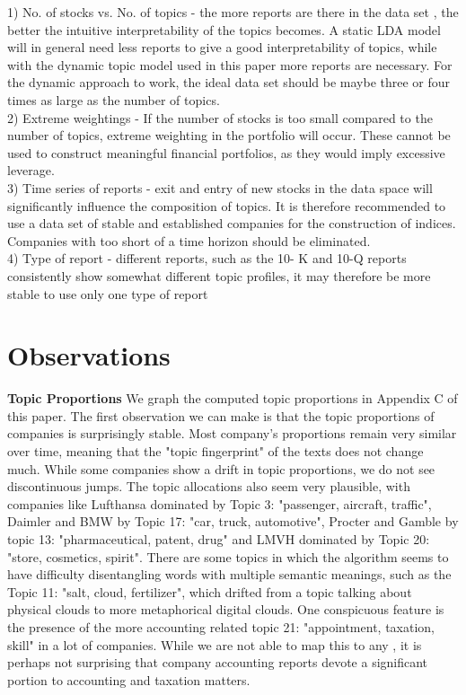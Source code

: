 \documentclass[12pt,journal,letterpaper,oneside,onecolumn]{IEEEtran}
\begin{document}
1) No. of stocks vs. No. of topics - the more reports are there in the data set , the better the intuitive interpretability of the topics becomes. A static LDA model will in general need less reports to give a good interpretability of topics, while with the dynamic topic model used in this paper more reports are necessary. For the dynamic approach to work, the ideal data set should be maybe three or four times as large as the number of topics.
\\
2) Extreme weightings - If the number of stocks is too small compared to the number of topics, extreme weighting in the portfolio will occur. These cannot be used to construct meaningful financial portfolios, as they would imply excessive leverage.
\\
3) Time series of reports - exit and entry of new stocks in the data space will significantly influence the composition of topics. It is therefore recommended to use a data set of stable and established companies for the construction of indices. Companies with too short of a time horizon should be eliminated.
\\
4) Type of report - different reports, such as the 10- K and 10-Q  reports consistently show somewhat different topic profiles, it may therefore be  more stable to use only one type of report


\section{Observations} 
\textbf{Topic Proportions}
We graph the computed topic proportions in Appendix C of this paper.
The first observation we can make is that the topic proportions of companies is surprisingly stable. 
Most company's proportions remain very similar over time, meaning that the "topic fingerprint" of the texts does not change much. While some companies show a drift in topic proportions, we do not see discontinuous jumps.
The topic allocations also seem very plausible, with companies like Lufthansa dominated by Topic 3: "passenger, aircraft, traffic", Daimler and BMW by Topic 17: "car, truck, automotive", Procter and Gamble by topic 13: "pharmaceutical, patent, drug" and LMVH dominated by Topic 20: "store, cosmetics, spirit".
There are some topics in which the algorithm seems to have difficulty disentangling words with multiple semantic meanings, such as the Topic 11: "salt, cloud, fertilizer", which drifted from a topic talking about physical clouds to more metaphorical digital clouds.
One conspicuous feature is the presence of the more accounting related topic 21: "appointment, taxation, skill" in a lot of companies.
While we are not able to map this to any , it is perhaps not surprising that company accounting reports devote a significant portion to accounting and taxation matters.
\end{document}
